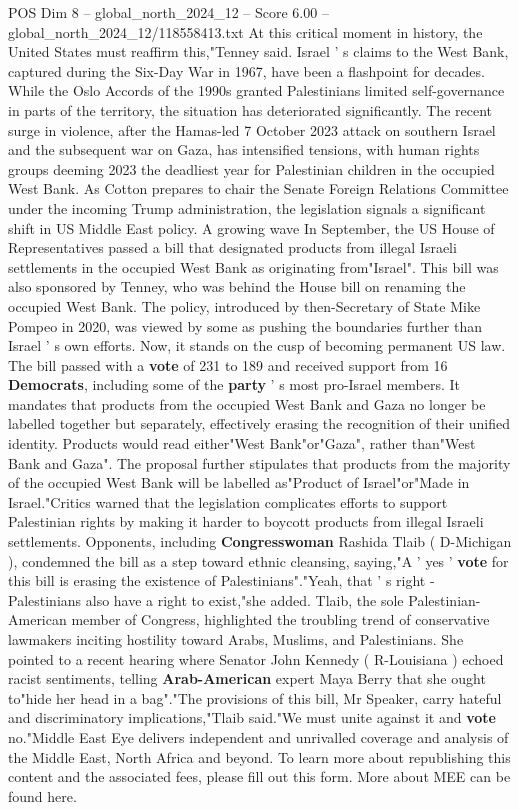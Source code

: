 \begin{textsample}{POS Dim 8 – global\_north\_2024\_12 – Score 6.00 – global\_north\_2024\_12/118558413.txt}
At this critical moment in history, the United States must reaffirm this,"Tenney said.
Israel ' s claims to the West Bank, captured during the Six-Day War in 1967, have been a flashpoint for decades.
While the Oslo Accords of the 1990s granted Palestinians limited self-governance in parts of the territory, the situation has deteriorated significantly.
The recent surge in violence, after the Hamas-led 7 October 2023 attack on southern Israel and the subsequent war on Gaza, has intensified tensions, with human rights groups deeming 2023 the deadliest year for Palestinian children in the occupied West Bank.
As Cotton prepares to chair the Senate Foreign Relations Committee under the incoming Trump administration, the legislation signals a significant shift in US Middle East policy.
A growing wave In September, the US House of Representatives passed a bill that designated products from illegal Israeli settlements in the occupied West Bank as originating from"Israel".
This bill was also sponsored by Tenney, who was behind the House bill on renaming the occupied West Bank.
The policy, introduced by then-Secretary of State Mike Pompeo in 2020, was viewed by some as pushing the boundaries further than Israel ' s own efforts.
Now, it stands on the cusp of becoming permanent US law.
The bill passed with a \textbf{vote} of 231 to 189 and received support from 16 \textbf{Democrats}, including some of the \textbf{party} ' s most pro-Israel members.
It mandates that products from the occupied West Bank and Gaza no longer be labelled together but separately, effectively erasing the recognition of their unified identity.
Products would read either"West Bank"or"Gaza", rather than"West Bank and Gaza".
The proposal further stipulates that products from the majority of the occupied West Bank will be labelled as"Product of Israel"or"Made in Israel."Critics warned that the legislation complicates efforts to support Palestinian rights by making it harder to boycott products from illegal Israeli settlements.
Opponents, including \textbf{Congresswoman} Rashida Tlaib ( D-Michigan ), condemned the bill as a step toward ethnic cleansing, saying,"A ' yes ' \textbf{vote} for this bill is erasing the existence of Palestinians"."Yeah, that ' s right - Palestinians also have a right to exist,"she added.
Tlaib, the sole Palestinian-American member of Congress, highlighted the troubling trend of conservative lawmakers inciting hostility toward Arabs, Muslims, and Palestinians.
She pointed to a recent hearing where Senator John Kennedy ( R-Louisiana ) echoed racist sentiments, telling \textbf{Arab-American} expert Maya Berry that she ought to"hide her head in a bag"."The provisions of this bill, Mr Speaker, carry hateful and discriminatory implications,"Tlaib said."We must unite against it and \textbf{vote} no."Middle East Eye delivers independent and unrivalled coverage and analysis of the Middle East, North Africa and beyond.
To learn more about republishing this content and the associated fees, please fill out this form.
More about MEE can be found here.

\end{textsample}
